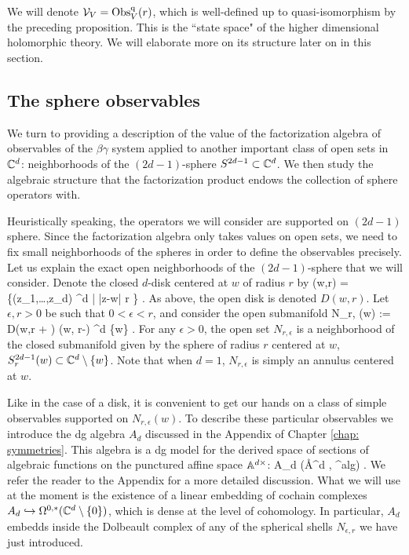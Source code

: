 We will denote $\cV_V = \Obs_V^\q(r)$, which is well-defined up to quasi-isomorphism by the preceding proposition. 
This is the ``state space" of the higher dimensional holomorphic theory. 
We will elaborate more on its structure later on in this section.

\subsection{The sphere observables} \label{sec: sphere ops}

We turn to providing a description of the value of the factorization algebra of observables of the $\beta\gamma$ system applied to another important class of open sets in $\CC^d$: neighborhoods of the $(2d-1)$-sphere $S^{2d-1} \subset \CC^d$. 
We then study the algebraic structure that the factorization product endows the collection of sphere operators with.

Heuristically speaking, the operators we will consider are supported on $(2d-1)$ sphere.
Since the factorization algebra only takes values on open sets, we need to fix small neighborhoods of the spheres in order to define the observables precisely.
Let us explain the exact open neighborhoods of the $(2d-1)$-sphere that we will consider.
Denote the closed $d$-disk centered at $w$ of radius $r$ by
\ben
{}(w,r) = \left\{(z_1,\ldots,z_d) \in \CC^d \; | \; |z-w| \leq r \right\} . 
\een
As above, the open disk is denoted $D(w,r)$. 
Let $\epsilon,r > 0$ be such that $0 < \epsilon < r$, and consider the open submanifold
\ben
N_{r, \epsilon}(w) := D(w,r + \epsilon) \setminus {}(w, r-\epsilon) \subset \CC^d \setminus \{w\} .
\een 
For any $\epsilon > 0$, the open set $N_{r,\epsilon}$ is a neighborhood of the closed submanifold given by the sphere of radius $r$ centered at $w$, $S^{2d-1}_r(w) \subset \CC^d \setminus \{w\}$. 
Note that when $d=1$, $N_{r,\epsilon}$ is simply an annulus centered at $w$. 

Like in the case of a disk, it is convenient to get our hands on a class of simple observables supported on $N_{r,\epsilon}(w)$. 
To describe these particular observables we introduce the dg algebra $A_d$ discussed in the Appendix of Chapter \ref{chap: symmetries}.
This algebra is a dg model for the derived space of sections of algebraic functions on the punctured affine space $\AA^{d \times}$:
\ben 
A_d \simeq \RR \Gamma(\AA^{d \times}, \sO^{alg}) .
\een
We refer the reader to the Appendix for a more detailed discussion.
What we will use at the moment is the existence of a linear embedding of cochain complexes $A_d \hookrightarrow \Omega^{0,*}(\CC^d \setminus \{0\})$, which is dense at the level of cohomology.
In particular, $A_d$ embedds inside the Dolbeault complex of any of the spherical shells $N_{\epsilon,r}$ we have just introduced.

